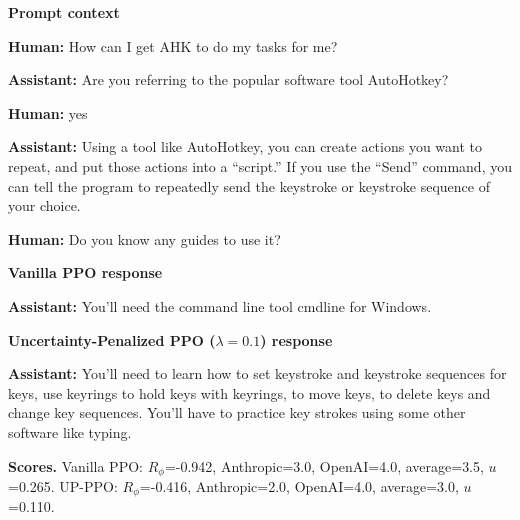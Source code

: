 \documentclass[twocolumn,10pt]{article}
\newcommand{\Rphi}{R_{\phi}}
\begin{document}
\begin{tcolorbox}[enhanced,breakable,colback=SoftGray,colframe=black!45,boxrule=0.35pt,arc=1.2mm,left=3pt,right=3pt,top=3pt,bottom=3pt,before skip=4pt,after skip=5pt]
\textbf{Prompt context}\par\smallskip
\textbf{Human:} How can I get AHK to do my tasks for me?

\textbf{Assistant:} Are you referring to the popular software tool AutoHotkey?

\textbf{Human:} yes

\textbf{Assistant:} Using a tool like AutoHotkey, you can create actions you want to repeat, and put those actions into a “script.” If you use the “Send” command, you can tell the program to repeatedly send the keystroke or keystroke sequence of your choice.

\textbf{Human:} Do you know any guides to use it?
\end{tcolorbox}


\begin{tcolorbox}[enhanced,breakable,colback=SoftRed,colframe=black!45,boxrule=0.35pt,arc=1.2mm,left=3pt,right=3pt,top=3pt,bottom=3pt,before skip=4pt,after skip=5pt]
\textbf{Vanilla PPO response}\par\smallskip
\textbf{Assistant:} You’ll need the command line tool cmdline for Windows.
\end{tcolorbox}


\begin{tcolorbox}[enhanced,breakable,colback=SoftBlue,colframe=black!45,boxrule=0.35pt,arc=1.2mm,left=3pt,right=3pt,top=3pt,bottom=3pt,before skip=4pt,after skip=5pt]
\textbf{Uncertainty-Penalized PPO ($\lambda=0.1$) response}\par\smallskip
\textbf{Assistant:} You’ll need to learn how to set keystroke and keystroke sequences for keys, use keyrings to hold keys with keyrings, to move keys, to delete keys and change key sequences. You’ll have to practice key strokes using some other software like typing.
\end{tcolorbox}


\begin{tcolorbox}[enhanced,breakable,colback=white,colframe=black!35,boxrule=0.25pt,arc=1.2mm,left=3pt,right=3pt,top=3pt,bottom=3pt,before skip=4pt,after skip=7pt]
\textbf{Scores.} Vanilla PPO: $\Rphi$=-0.942, Anthropic=3.0, OpenAI=4.0, average=3.5, $u$=0.265. UP-PPO: $\Rphi$=-0.416, Anthropic=2.0, OpenAI=4.0, average=3.0, $u$=0.110.
\end{tcolorbox}
\end{document}
